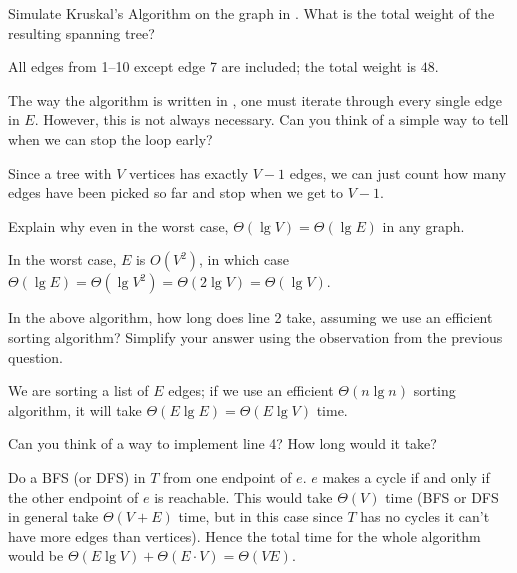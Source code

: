 \documentclass{tufte-handout}
\begin{document}
\begin{questions}
\item Simulate Kruskal's Algorithm on the graph in
  .  What is the total weight of the resulting
  spanning tree?

  \begin{answer}
  All edges from 1--10 except edge 7 are included; the total
  weight is $48$.
  \end{answer}
\item The way the algorithm is written in , one
  must iterate through every single edge in $E$.  However, this is not
  always necessary.  Can you think of a simple way to tell when we can
  stop the loop early?

  \begin{answer}
    Since a tree with $V$ vertices has exactly $V-1$ edges, we can
    just count how many edges have been picked so far and stop when we
    get to $V-1$.
  \end{answer}
\item Explain why even in the worst case,
  $\Theta(\lg V) = \Theta(\lg E)$ in any graph. 

  \begin{answer}
    In the worst case, $E$ is $O(V^2)$, in which case $\Theta(\lg
    E) = \Theta(\lg V^2) = \Theta(2 \lg V) = \Theta(\lg V)$.
  \end{answer}
\item In the above algorithm, how long does line 2 take, assuming we
  use an efficient sorting algorithm?  Simplify your answer using the
  observation from the previous question.

  \begin{answer}
    We are sorting a list of $E$ edges; if we use an efficient
    $\Theta(n \lg n)$ sorting algorithm, it will take $\Theta(E \lg E)
    = \Theta(E \lg V)$ time.
  \end{answer}
\item Can you think of a way to implement line 4?  How long would it
  take?

  \begin{answer}
    Do a BFS (or DFS) in $T$ from one endpoint of $e$.  $e$
    makes a cycle if and only if the other endpoint of $e$ is
    reachable.  This would take $\Theta(V)$ time (BFS or DFS in
    general take $\Theta(V+E)$ time, but in this case since $T$ has no
    cycles it can't have more edges than vertices).  Hence the total
    time for the whole algorithm would be $\Theta(E \lg V) + \Theta(E
    \cdot V) = \Theta(VE)$.
  \end{answer}
\end{questions}
\end{document}
